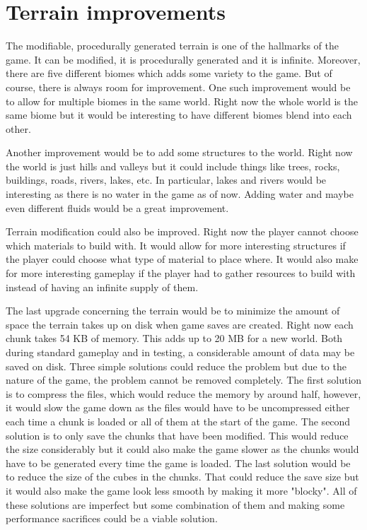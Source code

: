 \section{Terrain improvements}
The modifiable, procedurally generated terrain is one of the hallmarks of the game.
It can be modified, it is procedurally generated and it is infinite.
Moreover, there are five different biomes which adds some variety to the game.
But of course, there is always room for improvement.
One such improvement would be to allow for multiple biomes in the same world.
Right now the whole world is the same biome but it would be interesting to have different biomes blend into each other.

Another improvement would be to add some structures to the world.
Right now the world is just hills and valleys but it could include things like trees, rocks, buildings, roads, rivers, lakes, etc.
In particular, lakes and rivers would be interesting as there is no water in the game as of now.
Adding water and maybe even different fluids would be a great improvement.

Terrain modification could also be improved.
Right now the player cannot choose which materials to build with.
It would allow for more interesting structures if the player could choose what type of material to place where.
It would also make for more interesting gameplay if the player had to gather resources to build with instead of having an infinite supply of them.

The last upgrade concerning the terrain would be to minimize the amount of space the terrain takes up on disk when game saves are created.
Right now each chunk takes 54 KB of memory.
This adds up to 20 MB for a new world.
Both during standard gameplay and in testing, a considerable amount of data may be saved on disk.
Three simple solutions could reduce the problem but due to the nature of the game, the problem cannot be removed completely.
The first solution is to compress the files, which would reduce the memory by around half, however, it would slow the game down as the files would have to be uncompressed either each time a chunk is loaded or all of them at the start of the game.
The second solution is to only save the chunks that have been modified.
This would reduce the size considerably but it could also make the game slower as the chunks would have to be generated every time the game is loaded.
The last solution would be to reduce the size of the cubes in the chunks. 
That could reduce the save size but it would also make the game look less smooth by making it more "blocky".
All of these solutions are imperfect but some combination of them and making some performance sacrifices could be a viable solution.